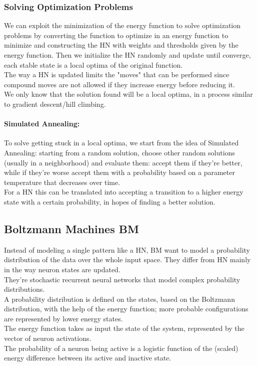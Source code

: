 \subsubsection{Solving Optimization Problems}
We can exploit the minimization of the energy function to solve optimization problems by converting the function to optimize in an energy function to minimize and constructing the HN with weights and thresholds given by the energy function. Then we initialize the HN randomly and update until converge, each stable state is a local optima of the original function.\\

The way a HN is updated limits the "moves" that can be performed since compound moves are not allowed if they increase energy before reducing it.\\
We only know that the solution found will be a local optima, in a process similar to gradient descent/hill climbing.\\

\paragraph{Simulated Annealing:} To solve getting stuck in a local optima, we start from the idea of Simulated Annealing: starting from a random solution, choose other random solutions (usually in a neighborhood) and evaluate them: accept them if they're better, while if they're worse accept them with a probability based on a parameter temperature that decreases over time.\\

For a HN this can be translated into accepting a transition to a higher energy state with a certain probability, in hopes of finding a better solution.\\

\subsection{Boltzmann Machines BM}

Instead of modeling a single pattern like a HN, BM want to model a probability distribution of the data over the whole input space. They differ from HN mainly in the way neuron states are updated.\\
They're stochastic recurrent neural networks that model complex probability distributions.\\

A probability distribution is defined on the states, based on the Boltzmann distribution, with the help of the energy function; more probable configurations are represented by lower energy states.\\
The energy function takes as input the state of the system, represented by the vector of neuron activations.\\
The probability of a neuron being active is a logistic function of the (scaled) energy difference between its active and inactive state.\\

